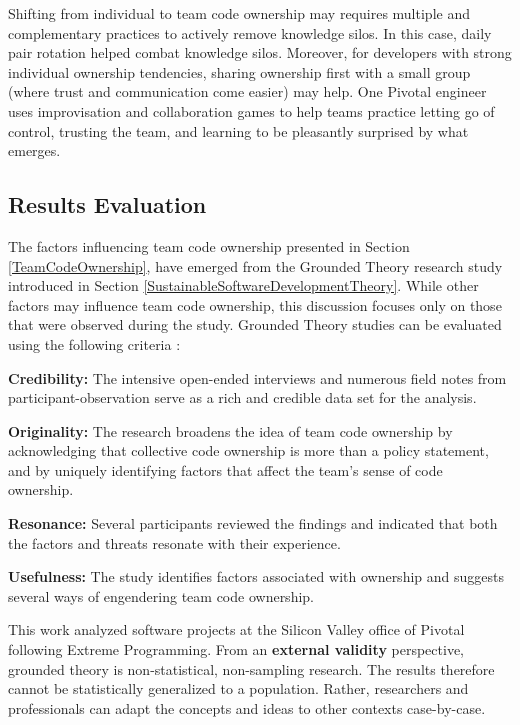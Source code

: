 Shifting from individual to team code ownership may requires multiple and complementary practices to actively remove knowledge silos. In this case, daily pair rotation helped combat knowledge silos. Moreover, for developers with strong individual ownership tendencies, sharing ownership first with a small group (where trust and communication come easier) may help. One Pivotal engineer uses improvisation and collaboration games to help teams practice letting go of control, trusting the team, and learning to be pleasantly surprised by what emerges. 

\subsection{Results Evaluation}

The factors influencing team code ownership presented in Section \ref{TeamCodeOwnership}, have emerged from the Grounded Theory research study introduced in Section \ref{SustainableSoftwareDevelopmentTheory}. While other factors may influence team code ownership, this discussion focuses only on those that were observed during the study. Grounded Theory studies can be evaluated using the following criteria \cite{Charmaz}: 

\textbf{Credibility:}  The \numberOfInterviews{} intensive open-ended interviews and numerous field notes from participant-observation serve as a rich and credible data set for the analysis. 

\textbf{Originality:} The research broadens the idea of team code ownership by acknowledging that collective code ownership is more than a policy statement, and by uniquely identifying factors that affect the team's sense of code ownership.

\textbf{Resonance:} Several participants reviewed the findings and indicated that both the factors and threats resonate with their experience.

\textbf{Usefulness:} The study identifies factors associated with ownership and suggests several ways of engendering team code ownership.

This work analyzed software projects at the Silicon Valley office of Pivotal following Extreme Programming. From an \textbf{external validity} perspective, grounded theory is non-statistical, non-sampling research. The results therefore cannot be statistically generalized to a population. Rather, researchers and professionals can adapt the concepts and ideas to other contexts case-by-case. 

